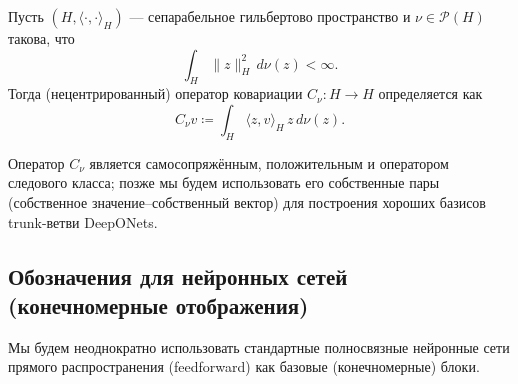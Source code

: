 \documentclass[../NDCNNAI_main.tex]{subfiles}
\begin{document}
\begin{definition}
Пусть $(H,\langle\cdot,\cdot\rangle_H)$ --- сепарабельное гильбертово пространство и
$\nu \in \mathcal{P}(H)$ такова, что
$$
\int_H \|z\|_H^2\, d\nu(z) < \infty.
$$
Тогда (нецентрированный) оператор ковариации $C_\nu\colon H \to H$ определяется как
$$
C_\nu v \coloneq \int_H \langle z, v\rangle_H\, z\, d\nu(z).
$$
\end{definition}

\begin{remark}
Оператор $C_\nu$ является самосопряжённым, положительным и оператором следового класса; позже мы будем использовать его собственные пары (собственное значение–собственный вектор) для построения хороших базисов trunk-ветви DeepONets.
\end{remark}



\subsection*{Обозначения для нейронных сетей (конечномерные отображения)}

Мы будем неоднократно использовать стандартные полносвязные нейронные сети прямого распространения (feedforward) как базовые (конечномерные) блоки.
\end{document}

